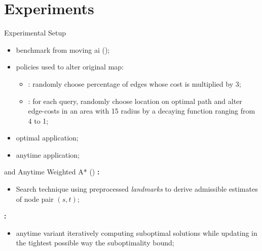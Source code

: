 \section*{Experiments}

\begin{frame}{Experimental Setup}
    
    \begin{itemize}
        \item benchmark from moving ai ();
        \item policies used to alter original map:
            \begin{itemize}
                \item {}: randomly choose percentage of edges whose cost is multiplied by 3;
                \item {}: for each query, randomly choose location on optimal path and alter edge-costs in an area with 15 radius by a decaying function ranging from 4 to 1;
            \end{itemize}
        \item optimal application;
        \item anytime application;
    \end{itemize}
\end{frame}

\begin{frame}{\ALT{} and Anytime Weighted A* (\AWA{})}
    \textbf{\ALT{}:}
    \begin{itemize}
        \item Search technique using preprocessed \textit{landmarks} to derive admissible
            estimates of node pair $(s, t)$;
    \end{itemize}
    \textbf{\AWA{}:}
    \begin{itemize}
        \item \WA{} anytime variant iteratively computing suboptimal solutions while updating in the tightest possible way the suboptimality bound;
    \end{itemize}
\end{frame}

